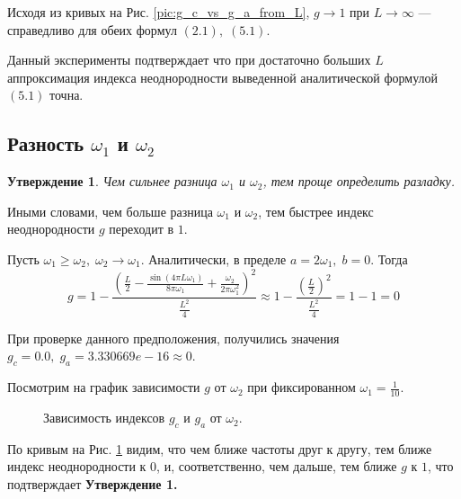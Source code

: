 \documentclass[specialist, substylefile = spbu.rtx,
			   subf, href, 12pt]{disser}
\begin{document}
Исходя из кривых на Рис. \ref{pic:g_c_vs_g_a_from_L}, $ g \rightarrow 1 \text{ при } L \rightarrow \infty$ --- справедливо для обеих формул $ (2.1), \; (5.1) $. 

Данный эксперименты подтверждает что при достаточно больших $ L $ аппроксимация индекса неоднородности выведенной аналитической формулой $ (5.1) $ точна.

\subsection{Разность $\omega_1$ и $ \omega_2 $}
\newtheorem{statement}{Утверждение}

\begin{statement}
	Чем сильнее разница $ \omega_1 $ и $ \omega_2 $, тем проще определить разладку.
\end{statement}

Иными словами, чем больше разница $ \omega_1 $ и $ \omega_2 $, тем быстрее индекс неоднородности $ g $ переходит в $ 1 $.

Пусть $ \omega_1 \geq \omega_2, \; \omega_2 \rightarrow \omega_1 $. Аналитически, в пределе $ a = 2\omega_1,\; b = 0 $. Тогда $$ g = 1 - \frac{(\frac{L}{2} - \frac{\sin(4\pi L\omega_1)}{8\pi\omega_1} + \frac{\omega_2}{2\pi\omega_1^2})^2}{\frac{L^2}{4}} \approx 1 - \frac{(\frac{L}{2})^2}{\frac{L^2}{4}} = 1 - 1 = 0 $$

При проверке данного предположения, получились значения $ g_c = 0.0,\; g_a = 3.330669e-16 \approx 0 $.

Посмотрим на график зависимости $ g $ от $ \omega_2 $ при фиксированном $ \omega_1 = \frac{1}{10} $.

\begin{figure}[!hhh]
	\caption{Зависимость индексов $ g_c $ и $ g_a $ от $ \omega_2 $.}
	\label{pic:g_c_vs_g_a_from_w_2}
\end{figure}

По кривым на Рис. \ref{pic:g_c_vs_g_a_from_w_2} видим, что чем ближе частоты друг к другу, тем ближе индекс неоднородности к $ 0 $, и, соответственно, чем дальше, тем ближе $ g $ к $ 1 $, что подтверждает \textbf{Утверждение 1.}
\end{document}
